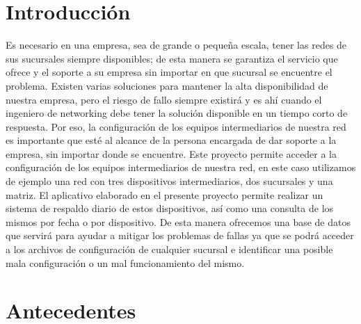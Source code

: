 \documentclass[conference]{IEEEtran}
\begin{document}
\section{Introducción}\label{sec:int}
Es necesario en una empresa, sea de grande o pequeña escala, tener las redes de sus sucursales siempre disponibles; de esta manera se garantiza el servicio que ofrece y el soporte a su empresa sin importar en que sucursal se encuentre el problema. Existen varias soluciones para mantener la alta disponibilidad de nuestra empresa, pero el riesgo de fallo siempre existirá y es ahí cuando el ingeniero de networking debe tener la solución disponible en un tiempo corto de respuesta. Por eso, la configuración de los equipos intermediarios de nuestra red es importante que esté al alcance de la persona encargada de dar soporte a la empresa, sin importar donde se encuentre. Este proyecto permite acceder a la configuración de los equipos intermediarios de nuestra red, en este caso utilizamos de ejemplo una red con tres dispositivos intermediarios, dos sucursales y una matriz. El aplicativo elaborado en el presente proyecto permite realizar un sistema de respaldo diario de estos dispositivos, así como una consulta de los mismos por fecha o por dispositivo. De esta manera ofrecemos una base de datos que servirá para ayudar a mitigar los problemas de fallas ya que se podrá acceder a los archivos de configuración de cualquier sucursal e identificar una posible mala configuración o un mal funcionamiento del mismo.

\section{Antecedentes}\label{sec:ant}
\end{document}
